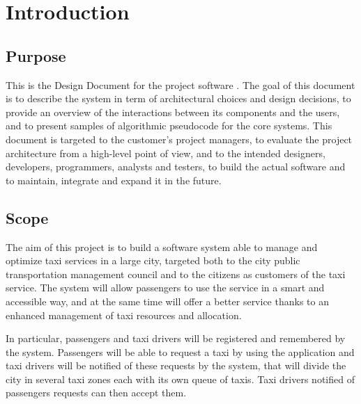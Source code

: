 \chapter{Introduction}


\section{Purpose}
This is the Design Document for the project software \mts{}. The goal of this document is to describe the system in term of architectural choices and design decisions, to provide an overview of the interactions between its components and the users, and to present samples of algorithmic pseudocode for the core systems.
This document is targeted to the customer's project managers, to evaluate the project architecture from a high-level point of view, and to the intended designers, developers, programmers, analysts and testers, to build the actual software and to maintain, integrate and expand it in the future.


\section{Scope}
The aim of this project is to build a software system able to manage and optimize taxi services in a large city, targeted both to the city public transportation management council and to the citizens as customers of the taxi service. The system will allow passengers to use the service in a smart and accessible way, and at the same time will offer a better service thanks to an enhanced management of taxi resources and allocation.

In particular, passengers and taxi drivers will be registered and remembered by the system. Passengers will be able to request a taxi by using the application and taxi drivers will be notified of these requests by the system, that will divide the city in several taxi zones each with its own queue of taxis. Taxi drivers notified of passengers requests can then accept them.

